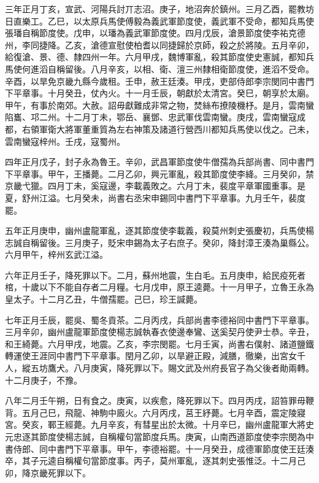 \begin{pinyinscope}
 三年正月丁亥，宣武、河陽兵討丌志沼。庚子，地沼奔於鎮州。三月乙酉，罷教坊日直樂工。乙巳，以太原兵馬使傅毅為義武軍節度使，義武軍不受命，都知兵馬使張璠自稱節度使。戊申，以璠為義武軍節度使。四月戊辰，滄景節度使李祐克德州，李同捷降。乙亥，滄德宣慰使柏耆以同捷歸於京師，殺之於將陵。五月辛卯，給復滄、景、德、隸四州一年。六月甲戌，魏博軍亂，殺其節度使史憲誠，都知兵馬使何進滔自稱留後。八月辛亥，以相、衛、澶三州隸相衛節度使，進滔不受命。辛酉，以旱免京畿九縣今歲租。壬申，赦王廷湊。甲戌，吏部侍郎李宗閔同中書門下平章事。十月癸丑，仗內火。十一月壬辰，朝獻於太清宮。癸巳，朝享於太廟。甲午，有事於南郊。大赦。詔毋獻難成非常之物，焚絲布撩陵機杼。是月，雲南蠻陷巂、邛二州。十二月丁未，鄂岳、襄鄧、忠武軍伐雲南蠻。庚戌，雲南蠻寇成都，右領軍衛大將軍董重質為左右神策及諸道行營西川都知兵馬使以伐之。己未，雲南蠻寇梓州。壬戌，寇蜀州。



 四年正月戊子，封子永為魯王。辛卯，武昌軍節度使牛僧孺為兵部尚書、同中書門下平章事。甲午，王播薨。二月乙卯，興元軍亂，殺其節度使李絳。三月癸卯，禁京畿弋獵。四月丁未，奚寇邊，李載義敗之。六月丁未，裴度平章軍國重事。是夏，舒州江溢。七月癸未，尚書右丞宋申錫同中書門下平章事。九月壬午，裴度罷。



 五年正月庚申，幽州盧龍軍亂，逐其節度使李載義，殺莫州刺史張慶初，兵馬使楊志誠自稱留後。三月庚子，貶宋申錫為太子右庶子。癸卯，降封漳王湊為巢縣公。六月甲午，梓州玄武江溢。



 六年正月壬子，降死罪以下。二月，蘇州地震，生白毛。五月庚申，給民疫死者棺，十歲以下不能自存者二月糧。七月戊申，原王逵薨。十一月甲子，立魯王永為皇太子。十二月乙丑，牛僧孺罷。己巳，珍王諴薨。



 七年正月壬辰，罷吳、蜀冬貢茶。二月丙戌，兵部尚書李德裕同中書門下平章事。三月辛卯，幽州盧龍軍節度使楊志誠執春衣使邊奉鸞、送奚契丹使尹士恭。辛丑，和王綺薨。六月甲戌，地震。乙亥，李宗閔罷。七月壬寅，尚書右僕射、諸道鹽鐵轉運使王涯同中書門下平章事。閏月乙卯，以旱避正殿，減膳，徹樂，出宮女千人，縱五坊鷹犬。八月庚寅，降死罪以下。賜文武及州府長官子為父後者勛兩轉。十二月庚子，不豫。



 八年二月壬午朔，日有食之。庚寅，以疾愈，降死罪以下。四月丙戌，詔笞罪毋鞭背。五月己巳，飛龍、神駒中廄火。六月丙戌，莒王紓薨。七月辛酉，震定陵寢宮。癸亥，鄆王經薨。九月辛亥，有彗星出於太微。十月辛巳，幽州盧龍軍大將史元忠逐其節度使楊志誠，自稱權句當節度兵馬。庚寅，山南西道節度使李宗閔為中書侍郎、同中書門下平章事。甲午，李德裕罷。十一月癸丑，成德軍節度使王廷湊卒，其子元逵自稱權句當節度事。丙子，莫州軍亂，逐其刺史張惟泛。十二月己卯，降京畿死罪以下。




\end{pinyinscope}
